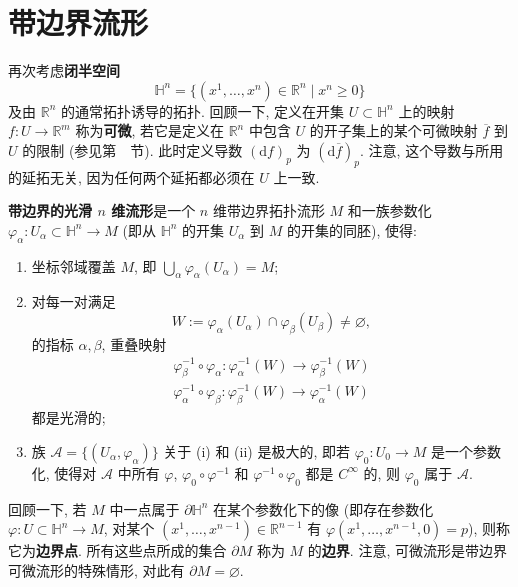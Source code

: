 \section{带边界流形}\label{sec:manifolds-with-boundary}

再次考虑\textbf{闭半空间}
\[
  \mathbb{H}^n=\{(x^1,\ldots,x^n)\in\mathbb{R}^n\mid x^n\geq 0\}
\]
及由 $\mathbb{R}^n$ 的通常拓扑诱导的拓扑. 回顾一下, 定义在开集 $U\subset\mathbb{H}^n$ 上的映射 $f:U\to\mathbb{R}^m$ 称为\textbf{可微}, 若它是定义在 $\mathbb{R}^n$ 中包含 $U$ 的开子集上的某个可微映射 $\overline f$ 到 $U$ 的限制 (参见第~~节). 此时定义导数 $(\mathrm{d}f)_p$ 为 $(\mathrm{d}\overline f)_p$. 注意, 这个导数与所用的延拓无关, 因为任何两个延拓都必须在 $U$ 上一致.

\begin{RiemannDefinition}\label{def:smooth-manifold-with-boundary}
\textbf{带边界的光滑 $n$ 维流形}是一个 $n$ 维带边界拓扑流形 $M$ 和一族参数化 $\varphi_\alpha:U_\alpha\subset\mathbb{H}^n\to M$ (即从 $\mathbb{H}^n$ 的开集 $U_\alpha$ 到 $M$ 的开集的同胚), 使得:
\begin{enumerate}[label=(\roman*),leftmargin=*]
\item 坐标邻域覆盖 $M$, 即 $\bigcup_\alpha\varphi_\alpha(U_\alpha)=M$;
\item 对每一对满足
\[
  W:=\varphi_\alpha(U_\alpha)\cap\varphi_\beta(U_\beta)\ne\varnothing,
\]
的指标 $\alpha,\beta$, 重叠映射
\begin{gather*}
  \varphi_\beta^{-1}\circ\varphi_\alpha:\varphi_\alpha^{-1}(W)\to\varphi_\beta^{-1}(W)\\
  \varphi_\alpha^{-1}\circ\varphi_\beta:\varphi_\beta^{-1}(W)\to\varphi_\alpha^{-1}(W)
\end{gather*}
都是光滑的;
\item 族 $\mathcal{A}=\{(U_\alpha,\varphi_\alpha)\}$ 关于 (i) 和 (ii) 是极大的, 即若 $\varphi_0:U_0\to M$ 是一个参数化, 使得对 $\mathcal{A}$ 中所有 $\varphi$, $\varphi_0\circ\varphi^{-1}$ 和 $\varphi^{-1}\circ\varphi_0$ 都是 $C^\infty$ 的, 则 $\varphi_0$ 属于 $\mathcal{A}$.
\end{enumerate}
\end{RiemannDefinition}

回顾一下, 若 $M$ 中一点属于 $\partial\mathbb{H}^n$ 在某个参数化下的像 (即存在参数化 $\varphi:U\subset\mathbb{H}^n\to M$, 对某个 $(x^1,\ldots,x^{n-1})\in\mathbb{R}^{n-1}$ 有 $\varphi(x^1,\ldots,x^{n-1},0)=p$), 则称它为\textbf{边界点}. 所有这些点所成的集合 $\partial M$ 称为 $M$ 的\textbf{边界}. 注意, 可微流形是带边界可微流形的特殊情形, 对此有 $\partial M=\varnothing$.

